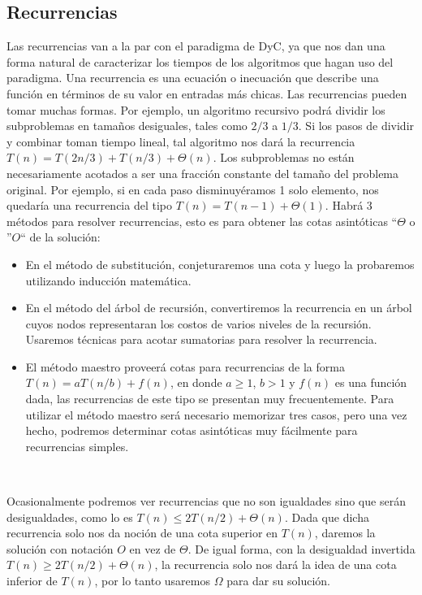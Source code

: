 \subsection{Recurrencias}

Las recurrencias van a la par con el paradigma de DyC, ya que nos dan una forma natural de caracterizar los tiempos de los algoritmos que hagan uso del paradigma. Una recurrencia es una ecuaci\'on o inecuaci\'on que describe una funci\'on en t\'erminos de su valor en entradas m\'as chicas. Las recurrencias pueden tomar muchas formas. Por ejemplo, un algoritmo recursivo podr\'a dividir los subproblemas en tama\~nos desiguales, tales como $2/3$ a $1/3$. Si los pasos de dividir y combinar toman tiempo lineal, tal algoritmo nos dar\'a la recurrencia $T(n) = T(2n/3) + T(n/3) + \Theta(n)$. Los subproblemas no están necesariamente acotados a ser una fracci\'on constante del tama\~no del problema original. Por ejemplo, si en cada paso disminuy\'eramos 1 solo elemento, nos quedar\'ia una recurrencia del tipo $T(n) = T(n-1) + \Theta(1)$. Habr\'a 3 m\'etodos para resolver recurrencias, esto es para obtener las cotas asint\'oticas ``$\Theta$ o ''$O$`` de la soluci\'on:

\begin{itemize}
 \item En el m\'etodo de substituci\'on, conjeturaremos una cota y luego la probaremos utilizando inducci\'on matem\'atica.
 \item En el m\'etodo del \'arbol de recursi\'on, convertiremos la recurrencia en un \'arbol cuyos nodos representaran los costos de varios niveles de la recursi\'on. Usaremos t\'ecnicas para acotar sumatorias para resolver la recurrencia.
 \item El m\'etodo maestro proveer\'a cotas para recurrencias de la forma $T(n) = aT(n/b) + f(n)$, en donde $a \geq 1$, $b > 1$ y $f(n)$ es una funci\'on dada, las recurrencias de este tipo se presentan muy frecuentemente. Para utilizar el m\'etodo maestro ser\'a necesario memorizar tres casos, pero una vez hecho, podremos determinar cotas asint\'oticas muy f\'acilmente para recurrencias simples.
\end{itemize}

~

Ocasionalmente podremos ver recurrencias que no son igualdades sino que ser\'an desigualdades, como lo es $T(n) \leq 2T(n/2) + \Theta(n)$. Dada que dicha recurrencia solo nos da noci\'on de una cota superior en $T(n)$, daremos la soluci\'on con notaci\'on $O$ en vez de $\Theta$. De igual forma, con la desigualdad invertida $T(n) \geq 2T(n/2) + \Theta(n)$, la recurrencia solo nos dar\'a la idea de una cota inferior de $T(n)$, por lo tanto usaremos $\Omega$ para dar su soluci\'on.

